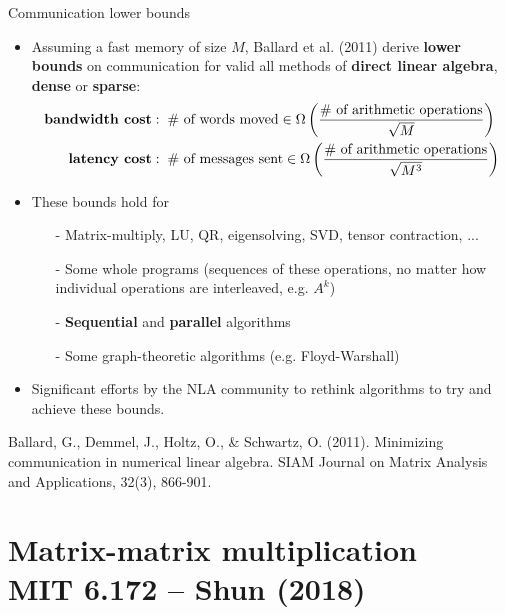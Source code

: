 \documentclass[t,usepdftitle=false]{beamer}
\begin{document}
\begin{frame}{Communication lower bounds}
\begin{itemize}
\item Assuming a fast memory of size $M$, Ballard et al. (2011) derive \textbf{lower bounds} on communication for valid all methods of \textbf{direct linear algebra}, \textbf{dense} or \textbf{sparse}:
\begin{align*}
\textbf{bandwidth cost}:&\hspace{.2cm}
\#\text{ of words moved}
\in
\Omega\left(\frac{\#\text{ of arithmetic operations}}{\sqrt{M}}\right)\\
\textbf{latency cost}:&\hspace{.2cm}
\#\text{ of messages sent}
\in
\Omega\left(\frac{\#\text{ of arithmetic operations}}{\sqrt{M^3}}\right)
\end{align*}
\item These bounds hold for
\begin{itemize}\normalsize
\item[-] Matrix-multiply, LU, QR, eigensolving, SVD, tensor contraction, ...
\item[-] Some whole programs (sequences of these operations, no matter how individual operations are interleaved, e.g. $A^k$)
\item[-] \textbf{Sequential} and \textbf{parallel} algorithms
\item[-] Some graph-theoretic algorithms (e.g. Floyd-Warshall)
\end{itemize}
\item Significant efforts by the NLA community to rethink algorithms to try and achieve these bounds.
\end{itemize}
\smallskip
\tiny{Ballard, G., Demmel, J., Holtz, O., \& Schwartz, O. (2011). Minimizing communication in numerical linear algebra. SIAM Journal on Matrix Analysis and Applications, 32(3), 866-901.}
\end{frame}

\section{Matrix-matrix multiplication\\
         {\small MIT 6.172 -- Shun (2018)}}
\end{document}
